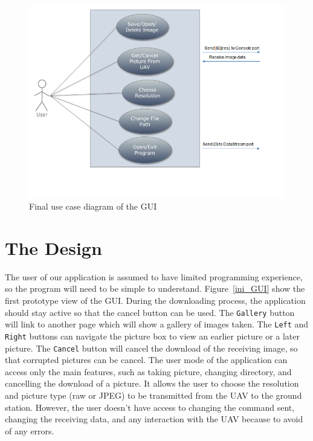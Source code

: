 \begin{figure}[!hbtp]
\begin{center}
\includegraphics[scale=0.7]{figures/FinaluserCase.png} 
\end{center}
\caption{Final use case diagram of the GUI\label{GUI_finalUseCase}}
\end{figure}

\section{The Design}

The user of our application is assumed to have limited programming experience, so the program will need to be simple to understand. Figure~\ref{ini_GUI} show the first prototype view of the GUI. 
During the downloading process, the application should stay active so that the cancel button can be used. 
The \texttt{Gallery} button will link to another page which will show a gallery of images taken. 
The \texttt{Left} and \texttt{Right} buttons can navigate the picture box to view an earlier picture or a later picture. 
The \texttt{Cancel} button will cancel the download of the receiving image, so that corrupted pictures can be cancel. 
The user mode of the application can access only the main features, such as taking picture, changing directory, and cancelling the download of a picture.  
It allows the user to choose the resolution and picture type (raw or JPEG) to be transmitted from the UAV to the ground station. However, the user doesn't have access to changing the command sent, changing the receiving data, and any interaction with the UAV because to avoid of any errors. 

